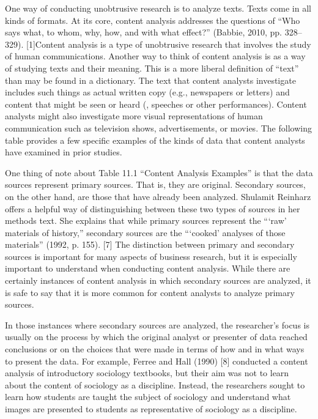 One way of conducting unobtrusive research is to analyze texts. Texts come in all kinds of formats. At its core, content analysis addresses the questions of ``Who says what, to whom, why, how, and with what effect?'' (Babbie, 2010, pp. 328–329). [1]Content analysis is a type of unobtrusive research that involves the study of human communications. Another way to think of content analysis is as a way of studying texts and their meaning. This is a more liberal definition of ``text'' than may be found in a dictionary. The text that content analysts investigate includes such things as actual written copy (e.g., newspapers or letters) and content that might be seen or heard (\eg, speeches or other performances). Content analysts might also investigate more visual representations of human communication such as television shows, advertisements, or movies. The following table provides a few specific examples of the kinds of data that content analysts have examined in prior studies. 

One thing of note about Table 11.1 ``Content Analysis Examples'' is that the data sources represent primary sources. That is, they are original. Secondary sources, on the other hand, are those that have already been analyzed. Shulamit Reinharz offers a helpful way of distinguishing between these two types of sources in her methods text. She explains that while primary sources represent the ``‘raw’ materials of history,'' secondary sources are the ``‘cooked’ analyses of those materials'' (1992, p. 155). [7] The distinction between primary and secondary sources is important for many aspects of business research, but it is especially important to understand when conducting content analysis. While there are certainly instances of content analysis in which secondary sources are analyzed, it is safe to say that it is more common for content analysts to analyze primary sources.

In those instances where secondary sources are analyzed, the researcher's focus is usually on the process by which the original analyst or presenter of data reached conclusions or on the choices that were made in terms of how and in what ways to present the data. For example, Ferree and Hall (1990) [8] conducted a content analysis of introductory sociology textbooks, but their aim was not to learn about the content of sociology as a discipline. Instead, the researchers sought to learn how students are taught the subject of sociology and understand what images are presented to students as representative of sociology as a discipline.

